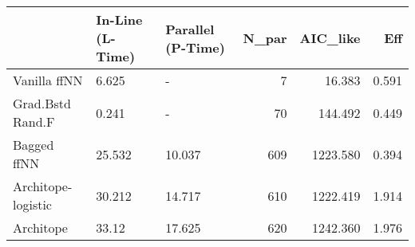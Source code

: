 \begin{tabular}{lllrrr}
\toprule
{} & In-Line (L-Time) & Parallel (P-Time) &  N\_par &  AIC\_like &    Eff \\
\midrule
Vanilla ffNN       &            6.625 &                 - &      7 &    16.383 &  0.591 \\
Grad.Bstd Rand.F   &            0.241 &                 - &     70 &   144.492 &  0.449 \\
Bagged ffNN        &           25.532 &            10.037 &    609 &  1223.580 &  0.394 \\
Architope-logistic &           30.212 &            14.717 &    610 &  1222.419 &  1.914 \\
Architope          &            33.12 &            17.625 &    620 &  1242.360 &  1.976 \\
\bottomrule
\end{tabular}
